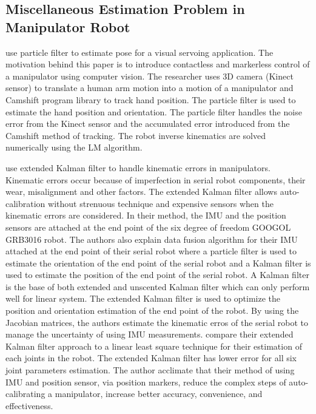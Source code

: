 \subsection{Miscellaneous Estimation Problem in Manipulator Robot}\label{sec:misc_state_estimation}
\textcite{Du2014} use particle filter to estimate pose for a visual servoing application.
The motivation behind this paper is to introduce contactless and markerless control of a
manipulator using computer vision. The researcher uses 3D camera (Kinect sensor) to translate
a human arm motion into a motion of a manipulator and Camshift program library to track hand
position. The particle filter is used to estimate the hand position and orientation. The particle
filter handles the noise error from the Kinect sensor and the accumulated error introduced from
the Camshift method of tracking. The robot inverse kinematics are solved numerically using the
\acrfull{LM} algorithm. 

\textcite{Du2014a} use extended Kalman filter to handle kinematic errors in
manipulators. Kinematic errors occur because of imperfection in serial robot components, their
wear, misalignment and other factors. The extended Kalman filter allows auto-calibration without
strenuous technique and expensive sensors when the kinematic errors are considered. In their
method, the IMU and the position sensors are attached at the end point of the six degree of
freedom GOOGOL GRB3016 robot. The authors also explain data fusion algorithm for their IMU
attached at the end point of their serial robot where a particle filter is used to estimate the
orientation of the end point of the serial robot and a Kalman filter is used to estimate the position
of the end point of the serial robot. A Kalman filter is the base of both extended and unscented
Kalman filter which can only perform well for linear system. The extended Kalman filter is used
to optimize the position and orientation estimation of the end point of the robot. By using the
Jacobian matrices, the authors estimate the kinematic erros of the serial robot to manage the
uncertainty of using IMU measurements. \textcite{Du2014} compare their extended Kalman
filter approach to a linear least square technique for their estimation of each joints in the robot.
The extended Kalman filter has lower error for all six joint parameters estimation. The author
acclimate that their method of using IMU and position sensor, via position markers, reduce the
complex steps of auto-calibrating a manipulator, increase better accuracy, convenience, and
effectiveness.

